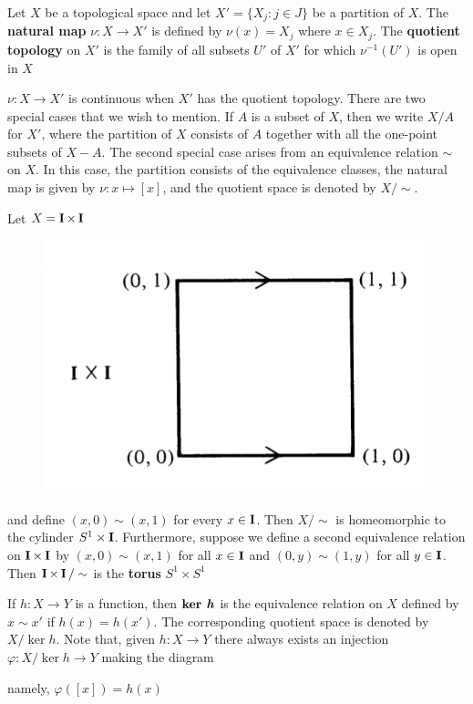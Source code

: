 \documentclass[11pt]{article}
\begin{document}
\begin{definition}[]
Let \(X\) be a topological space and let \(X'=\{X_j:j\in J\}\) be a partition of \(X\). The \textbf{natural
map} \(\nu:X\to X'\) is defined by \(\nu(x)=X_j\) where \(x\in X_j\). The \textbf{quotient topology} on \(X'\) is
the family of all subsets \(U'\) of \(X'\) for which \(\nu^{-1}(U')\) is open in \(X\)
\end{definition}

\(\nu:X\to X'\) is continuous when \(X'\) has the quotient topology. There are two special cases that
we wish to mention. If \(A\) is a subset of \(X\), then we write \(X/A\) for \(X'\), where the
partition of \(X\) consists of \(A\) together with all the one-point subsets of \(X-A\). The
second special case arises from an equivalence relation \(\sim\) on \(X\).  In this case, the
partition consists of the equivalence classes, the natural map is given by \(\nu:x\mapsto[x]\), and the
quotient space is denoted by \(X/\sim\).

\begin{examplle}[]
Let \(X=\operatorname{\textbf{I}}\times\operatorname{\textbf{I}}\)
\begin{figure}[htbp]
\centering
\includegraphics[width=.4\textwidth]{../images/AnIntroductionToAlgebraicTopology/2.png}
\label{}
\end{figure}
and define \((x,0)\sim(x,1)\) for every \(x\in\operatorname{\textbf{I}}\). Then \(X/\sim\) is homeomorphic to the
cylinder \(S^1\times\operatorname{\textbf{I}}\). Furthermore, suppose we define a second equivalence relation on \(\operatorname{\textbf{I}}\times\operatorname{\textbf{I}}\)
by \((x,0)\sim(x,1)\) for all \(x\in\operatorname{\textbf{I}}\) and \((0,y)\sim(1,y)\) for all \(y\in\operatorname{\textbf{I}}\). Then \(\operatorname{\textbf{I}}\times\operatorname{\textbf{I}}/\sim\) is the
\textbf{torus} \(S^1\times S^1\)
\end{examplle}

\begin{examplle}[]
\label{example1.3}
If \(h:X\to Y\) is a function, then \(\textbf{ker \textit{h}}\) is the equivalence relation on \(X\) defined
by \(x\sim x'\) if \(h(x)=h(x')\). The corresponding quotient space is denoted by \(X/\ker h\). Note
that, given \(h:X\to Y\) there always exists an injection \(\varphi:X/\ker h\to Y\) making the diagram
\begin{center}\end{center}
namely, \(\varphi([x])=h(x)\)
\end{examplle}
\end{document}
